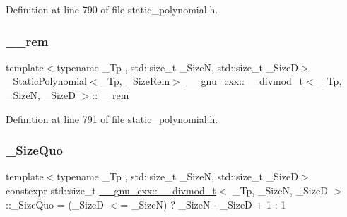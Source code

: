 Definition at line 790 of file static\+\_\+polynomial.\+h.

\mbox{\label{struct____gnu__cxx_1_1____divmod__t_ae3b5e6634fc53682a87e21d80fe44840}} 
\subsubsection{\texorpdfstring{\+\_\+\+\_\+rem}{\_\_rem}}
{\footnotesize\ttfamily template$<$typename \+\_\+\+Tp , std\+::size\+\_\+t \+\_\+\+SizeN, std\+::size\+\_\+t \+\_\+\+SizeD$>$ \\
\hyperlink{class____gnu__cxx_1_1__StaticPolynomial}{\+\_\+\+Static\+Polynomial}$<$\+\_\+\+Tp, \hyperlink{struct____gnu__cxx_1_1____divmod__t_a77870c1b7361b2b7511b0ef4d958826c}{\+\_\+\+Size\+Rem}$>$ \hyperlink{struct____gnu__cxx_1_1____divmod__t}{\+\_\+\+\_\+gnu\+\_\+cxx\+::\+\_\+\+\_\+divmod\+\_\+t}$<$ \+\_\+\+Tp, \+\_\+\+SizeN, \+\_\+\+SizeD $>$\+::\+\_\+\+\_\+rem}



Definition at line 791 of file static\+\_\+polynomial.\+h.

\mbox{\label{struct____gnu__cxx_1_1____divmod__t_a813f65f5716a3d6b124020686b294a24}} 
\subsubsection{\texorpdfstring{\+\_\+\+Size\+Quo}{\_SizeQuo}}
{\footnotesize\ttfamily template$<$typename \+\_\+\+Tp , std\+::size\+\_\+t \+\_\+\+SizeN, std\+::size\+\_\+t \+\_\+\+SizeD$>$ \\
constexpr std\+::size\+\_\+t \hyperlink{struct____gnu__cxx_1_1____divmod__t}{\+\_\+\+\_\+gnu\+\_\+cxx\+::\+\_\+\+\_\+divmod\+\_\+t}$<$ \+\_\+\+Tp, \+\_\+\+SizeN, \+\_\+\+SizeD $>$\+::\+\_\+\+Size\+Quo = (\+\_\+\+SizeD $<$= \+\_\+\+SizeN) ? \+\_\+\+SizeN -\/ \+\_\+\+SizeD + 1 \+: 1\hspace{0.3cm}{\ttfamily [static]}}



